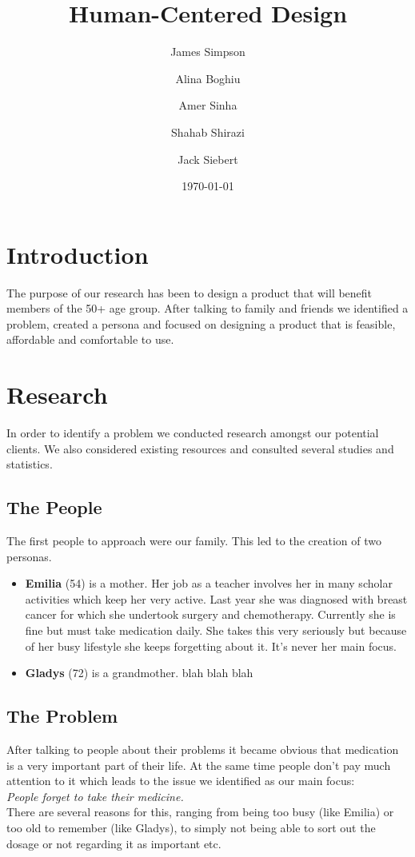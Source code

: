 \documentclass{article}
\begin{document}
\title{Human-Centered Design}
\author{James Simpson \and Alina Boghiu \and Amer Sinha \and Shahab Shirazi \and Jack Siebert}
\date{\today}
\maketitle

\section{Introduction}
The purpose of our research has been to design a product that will benefit members of the 50+ age group. After talking to family and friends we identified a problem, created a persona and focused on designing a product that is feasible, affordable and comfortable to use.

\section{Research}
In order to identify a problem we conducted research amongst our potential clients. We also considered existing resources and consulted several studies and statistics.

	\subsection{The People}
	The first people to approach were our family. This led to the creation of two personas.

	\begin{itemize}
	\item \textbf{Emilia} (54) is a mother. Her job as a teacher involves her in many scholar activities which keep her very active. Last year she was diagnosed with breast cancer for which she undertook surgery and chemotherapy. Currently she is fine but must take medication daily. She takes this very seriously but because of her busy lifestyle she keeps forgetting about it. It's never her main focus.

	\item \textbf{Gladys} (72) is a grandmother. blah blah blah
	\end{itemize}

	\subsection{The Problem}
	After talking to people about their problems it became obvious that medication is a very important part of their life. At the same time people don't pay much attention to it which leads to the issue we identified as our main focus:\medskip \\ \emph{People forget to take their medicine.} \medskip \\
	There are several reasons for this, ranging from being too busy (like Emilia) or too old to remember (like Gladys), to simply not being able to sort out the dosage or not regarding it as important etc.
\end{document}
